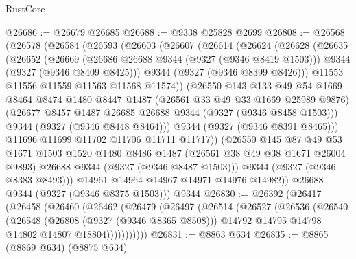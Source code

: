\begin{lexlean}{RustCore}
\begin{coremodule}
@26686 := @26679 @26685
@26688 := @9338 @25828 @2699
@26808 := @26568
    (@26578
      (@26584
        (@26593
          (@26603
            (@26607
              (@26614
                (@26624
                  (@26628
                    (@26635
                      (@26652
                        (@26669
                          (@26686 @26688 @9344 (@9327 (@9346 @8419 @1503)))
                          @9344
                          (@9327 (@9346 @8409 @8425)))
                        @9344
                        (@9327 (@9346 @8399 @8426)))
                      @11553
                      @11556
                      @11559
                      @11563
                      @11568
                      @11574))
                  (@26550
                    @143
                    @133
                    @49
                    @54
                    @1669
                    @8464
                    @8474
                    @1480
                    @8447
                    @1487
                    (@26561 @33 @49 @33 @1669 @25989 @9876)
                    (@26677 @8457 @1487 @26685 @26688 @9344 (@9327 (@9346 @8458 @1503)))
                    @9344
                    (@9327 (@9346 @8448 @8464)))
                  @9344
                  (@9327 (@9346 @8391 @8465)))
                @11696
                @11699
                @11702
                @11706
                @11711
                @11717))
            (@26550
              @145
              @87
              @49
              @53
              @1671
              @1503
              @1520
              @1480
              @8486
              @1487
              (@26561 @38 @49 @38 @1671 @26004 @9893)
              @26688
              @9344
              (@9327 (@9346 @8487 @1503)))
            @9344
            (@9327 (@9346 @8383 @8493)))
          @14961
          @14964
          @14967
          @14971
          @14976
          @14982))
      @26688
      @9344
      (@9327 (@9346 @8375 @1503)))
    @9344
@26830 := @26392
    (@26417
      (@26458
        (@26460
          (@26462
            (@26479
              (@26497
                (@26514
                  (@26527
                    (@26536
                      (@26540
                        (@26548
                          (@26808 (@9327 (@9346 @8365 @8508)))
                          @14792
                          @14795
                          @14798
                          @14802
                          @14807
                          @18804)))))))))))
@26831 := @8863 @634
@26835 := @8865 (@8869 @634) (@8875 @634)

\end{coremodule}
\end{lexlean}
